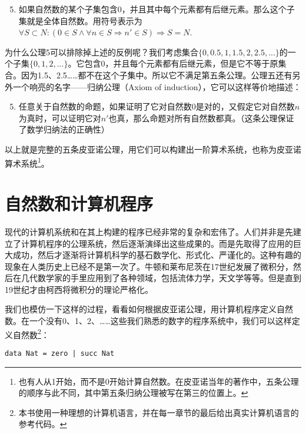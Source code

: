 \documentclass[UTF8]{article}
\begin{document}
\begin{enumerate}
  \setcounter{enumi}{4}
  \item 如果自然数的某个子集包含0，并且其中每个元素都有后继元素。那么这个子集就是全体自然数。用符号表示为$\forall S \subset N: (0 \in S \land \forall n \in S \Rightarrow n' \in S) \Rightarrow S = N$.
\end{enumerate}

为什么公理5可以排除掉上述的反例呢？我们考虑集合$\{0, 0.5, 1, 1.5, 2, 2.5, ...\}$的一个子集$\{0, 1, 2, ...\}$。它包含0，并且每个元素都有后继元素，但是它不等于原集合。因为1.5、2.5……都不在这个子集中。所以它不满足第五条公理。公理五还有另外一个响亮的名字——归纳公理（Axiom of induction），它可以这样等价地描述：

\begin{enumerate}
  \setcounter{enumi}{4}
  \item 任意关于自然数的命题，如果证明了它对自然数0是对的，又假定它对自然数$n$为真时，可以证明它对$n'$也真，那么命题对所有自然数都真。（这条公理保证了数学归纳法的正确性）
\end{enumerate}

以上就是完整的五条皮亚诺公理，用它们可以构建出一阶算术系统，也称为皮亚诺算术系统\footnote{也有人从1开始，而不是0开始计算自然数。在皮亚诺当年的著作中，五条公理的顺序与此不同，其中第五条归纳公理被写在第三的位置上。}。

\section{自然数和计算机程序}
现代的计算机系统和在其上构建的程序已经非常的复杂和宏伟了。人们并非是先建立了计算机程序的公理系统，然后逐渐演绎出这些成果的。而是先取得了应用的巨大成功，然后才逐渐将计算机科学的基石数学化、形式化、严谨化的。这种有趣的现象在人类历史上已经不是第一次了。牛顿和莱布尼茨在17世纪发展了微积分，然后在几代数学家的手里应用到了各种领域，包括流体力学，天文学等等。但是直到19世纪才由柯西将微积分的理论严格化。

我们也模仿一下这样的过程，看看如何根据皮亚诺公理，用计算机程序定义自然数。在一个没有0、1、2、……这些我们熟悉的数字的程序系统中，我们可以这样定义自然数\footnote{本书使用一种理想的计算机语言，并在每一章节的最后给出真实计算机语言的参考代码。}：

\lstset{language=Haskell}
\begin{lstlisting}
data Nat = zero | succ Nat
\end{lstlisting}

\end{document}
